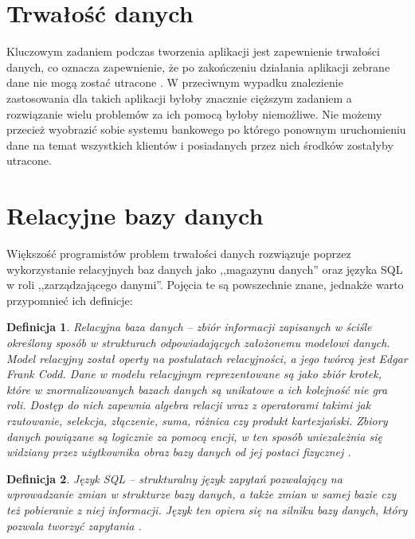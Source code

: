 \documentclass[12pt]{report}
\newtheorem{definition}{Definicja}
\begin{document}
\section{Trwałość danych}

Kluczowym zadaniem podczas tworzenia aplikacji jest zapewnienie trwałości da\-nych, co oznacza zapewnienie, że po zakończeniu działania aplikacji zebrane dane nie mogą
zostać utracone \cite{persistence}. W przeciwnym wypadku znalezienie zastosowania dla takich aplikacji byłoby znacznie cięższym zadaniem a rozwiązanie wielu problemów 
za ich pomocą byłoby niemożliwe. Nie możemy przecież wyobrazić sobie systemu bankowego po którego ponownym uruchomieniu dane na temat wszystkich klientów i
posiadanych przez nich środków zostałyby utracone.

\section{Relacyjne bazy danych}

Większość programistów problem trwałości danych rozwiązuje poprzez wykorzystanie relacyjnych baz danych jako ,,magazynu danych'' oraz języka SQL w roli ,,zarządzającego
danymi''. Pojęcia te są powszechnie znane, jednakże warto przypomnieć ich definicje:

\begin{definition}

Relacyjna baza danych -- zbiór informacji zapisanych w ściśle określony sposób w strukturach odpowiadających założonemu modelowi danych. Model relacyjny został operty 
na postulatach relacyjności, a jego twórcą jest Edgar Frank Codd. Dane w modelu relacyjnym reprezentowane są jako zbiór krotek, które w znormalizowanych bazach
danych są unikatowe a ich kolejność nie gra roli. Dostęp do nich zapewnia algebra relacji wraz z operatorami takimi jak rzutowanie, selekcja, złączenie, suma, różnica czy
produkt kartezjański. Zbiory danych powiązane są logicznie za pomocą encji, w ten sposób uniezależnia się widziany przez użytkownika obraz bazy danych od jej postaci fizycznej
\cite{rel}.
\end{definition}

\begin{definition}
Język SQL -- strukturalny język zapytań pozwalający na wprowadzanie zmian w strukturze bazy danych, a także zmian w samej bazie czy też pobieranie z niej informacji. Język 
ten opiera się na silniku bazy danych, który pozwala tworzyć zapytania \cite{sql}.
\end{definition}
\end{document}
